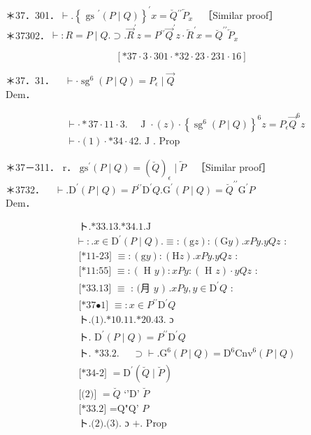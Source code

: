 \documentclass[10pt]{article}
\begin{document}
＊37．301．$\vdash .\left\{\text { gs }^{\prime}(P \mid Q)\right\}^{\prime} x=\breve{Q}{ }^{\prime \prime} \overleftarrow{P}_{x} \quad$［Similar proof］\\
＊37302．$\vdash: R=P \mid Q . \supset . \vec{R}^{\prime} z=P{ }^{\prime \prime} \vec{Q}^{\prime} z \cdot \overleftarrow{R}^{\prime} x=\breve{Q}^{\prime \prime} \overleftarrow{P}_{x}$

$$
[* 37 \cdot 3 \cdot 301 \cdot * 32 \cdot 23 \cdot 231 \cdot 16]
$$

＊37．31．$\quad \vdash \cdot \operatorname{sg}^{6}(P \mid Q)=P_{\epsilon} \mid \vec{Q}$\\
Dem．


\begin{align*}
& \vdash \cdot * 37 \cdot 11 \cdot 3 . \quad \text { J } \cdot(z) \cdot\left\{\operatorname{sg}^{6}(P \mid Q)\right\}^{6} z=P_{\epsilon} \vec{Q}^{6} z  \tag{1}\\
& \vdash \cdot(1) \cdot * 34 \cdot 42 . \text { J } \text {. Prop }
\end{align*}


＊37－311． r． $\mathrm{gs}^{\prime}(P \mid Q)=(\breve{Q})_{\epsilon} \mid \overleftarrow{P} \quad$［Similar proof］\\
＊3732．$\quad \vdash . \mathrm{D}^{\prime}(P \mid Q)=P{ }^{\prime \prime} \mathrm{D}^{\prime} Q . \mathrm{G}^{\prime}(P \mid Q)=\breve{Q}^{\prime \prime} \mathrm{G}^{\prime} P$\\
Dem．


\begin{align*}
& \text { ト.*33.13.*34.1.J } \\
& \vdash: . x \in \mathrm{D}^{\prime}(P \mid Q) . \equiv:(\mathrm{g} z):(\mathrm{G} y) . x P y . y Q z \text { : } \\
& \text { [*11-23] } \equiv:(\mathrm{g} y):(\mathrm{H} z) . x P y . y Q z \text { : } \\
& \text { [*11:55] } \equiv:(\text { H } y): x P y:(\text { H } z) \cdot y Q z \text { : } \\
& \text { [*33.13] } \equiv \text { : (月 } y \text { ) } . x P y, y \in \mathrm{D}^{\prime} Q \text { : } \\
& \text { [*37•1] } \equiv: x \in P^{\prime \prime} \mathrm{D}^{\prime} Q  \tag{1}\\
& \text { ト.(1).*10.11.*20.43. ɔ } \\
& \text { ト. } \mathrm{D}^{\prime}(P \mid Q)=P^{\prime \prime} \mathrm{D}^{\prime} Q  \tag{2}\\
& \text { ト. *33.2. } \quad \supset \vdash . \mathrm{G}^{6}(P \mid Q)=\mathrm{D}^{6} \mathrm{Cnv}^{6}(P \mid Q) \\
& \text { [*34-2] }=\mathrm{D}^{\prime}(\breve{Q} \mid \breve{P}) \\
& \text { [(2)] }=\breve{Q} \text { ‘’D’ } \breve{P} \\
& \text { [*33.2] =Q"Q' } P  \tag{3}\\
& \text { ト.(2).(3). ɔ }+ \text {. Prop }
\end{align*}
\end{document}
